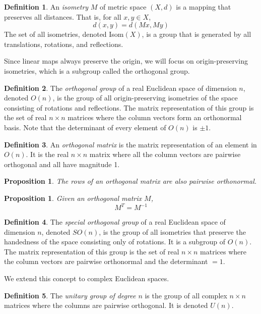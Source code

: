 \documentclass{article}
\newtheorem{proposition}[theorem]{Proposition}
\theoremstyle{remark}
\theoremstyle{definition}
\newtheorem{definition}{Definition}[section]
\begin{document}
\begin{definition}
An \textit{isometry} $M$ of metric space $(X, d)$ is a mapping that preserves all distances. That is, for all $x, y \in X$, 
\[d(x, y) = d(M x, M y) \]
The set of all isometries, denoted Isom$(X)$, is a group that is generated by all translations, rotations, and reflections. 
\end{definition}

Since linear maps always preserve the origin, we will focus on origin-preserving isometries, which is a subgroup called the orthogonal group.

\begin{definition}
The \textit{orthogonal group} of a real Euclidean space of dimension $n$, denoted $O(n)$, is the group of all origin-preserving isometries of the space consisting of rotations and reflections. The matrix representation of this group is the set of real $n \times n$ matrices where the column vectors form an orthonormal basis. Note that the determinant of every element of $O(n)$ is $\pm 1$. 
\end{definition}

\begin{definition}
An \textit{orthogonal matrix} is the matrix representation of an element in $O(n)$. It is the real $n \times n$ matrix where all the column vectors are pairwise orthogonal and all have magnitude 1. 
\end{definition}

\begin{proposition}
The rows of an orthogonal matrix are also pairwise orthonormal.
\end{proposition}

\begin{proposition}
Given an orthogonal matrix $M$,
\[M^T = M^{-1}\]
\end{proposition}

\begin{definition}
The \textit{special orthogonal group} of a real Euclidean space of dimension $n$, denoted $SO(n)$, is the group of all isometries that preserve the handedness of the space consisting only of rotations. It is a subgroup of $O(n)$. The matrix representation of this group is the set of real $n \times n$ matrices where the column vectors are pairwise orthonormal and the determinant $=1$. 
\end{definition}

We extend this concept to complex Euclidean spaces. 

\begin{definition}
The \textit{unitary group of degree $n$} is the group of all complex $n \times n$ matrices where the columns are pairwise orthogonal. It is denoted $U(n)$. 
\end{definition}
\end{document}
